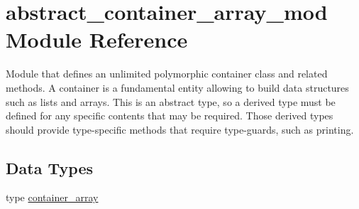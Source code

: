 \hypertarget{namespaceabstract__container__array__mod}{}\section{abstract\+\_\+container\+\_\+array\+\_\+mod Module Reference}
\label{namespaceabstract__container__array__mod}


Module that defines an unlimited polymorphic container class and related methods. A container is a fundamental entity allowing to build data structures such as lists and arrays. This is an abstract type, so a derived type must be defined for any specific contents that may be required. Those derived types should provide type-\/specific methods that require type-\/guards, such as printing.  


\subsection*{Data Types}
\begin{DoxyCompactItemize}
\item 
type \mbox{\hyperlink{structabstract__container__array__mod_1_1container__array}{container\+\_\+array}}
\end{DoxyCompactItemize}

